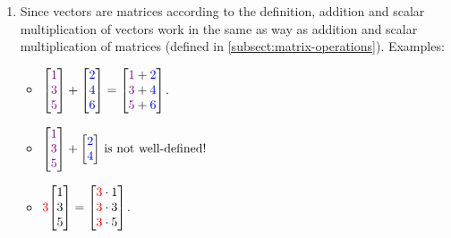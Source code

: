 \begin{enumerate}
\item Since vectors are matrices according to the definition, addition and
scalar multiplication of vectors work in the same as way as addition and scalar
multiplication of matrices (defined in \cref{subsect:matrix-operations}).
Examples:
\begin{itemize}
\item 
\(\displaystyle 
\mqty[\vc{1}\\\vc{3}\\\vc{5}]
+\mqty[\blc{2}\\\blc{4}\\\blc{6}]
=\mqty[
\vc{1}+\blc{2}\\ \vc{3}+\blc{4}\\ \vc{5}+\blc{6}
]\).
\item 
\(\displaystyle 
\mqty[\vc{1}\\\vc{3}\\\vc{5}]
+\mqty[\blc{2}\\\blc{4}]
\text{ is not well-defined!}\)
\item \(\displaystyle 
\rc{3}\mqty[1\\3\\5]
=\mqty[\rc{3}\cdot 1\\ \rc{3}\cdot 3\\ \rc{3}\cdot 5]
\).
\end{itemize}


\end{enumerate}
